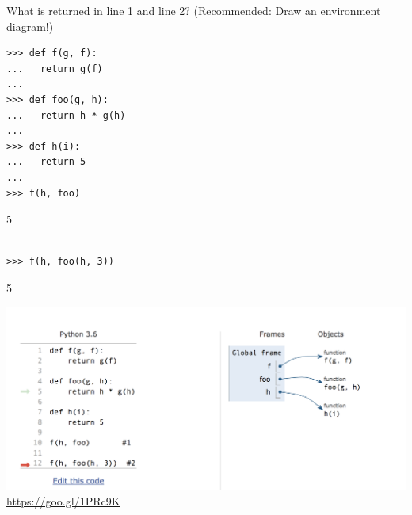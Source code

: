\begin{blocksection}
\question What is returned in line 1 and line 2? (Recommended: Draw an environment diagram!)

\begin{lstlisting}
>>> def f(g, f):
...   return g(f)
...
>>> def foo(g, h):
...   return h * g(h)
...
>>> def h(i):
...   return 5
...
>>> f(h, foo)
\end{lstlisting}

\begin{solution}

5
\end{solution}

\begin{lstlisting}

>>> f(h, foo(h, 3))
\end{lstlisting}
\begin{solution}

5
\end{solution}
\begin{solution}
\includegraphics[scale=0.5]{foohi.png}
\newline
\url{https://goo.gl/1PRc9K}
\end{solution}
\end{blocksection}
